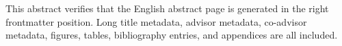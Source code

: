 This abstract verifies that the English abstract page is generated in the right
frontmatter position. Long title metadata, advisor metadata, co-advisor metadata,
figures, tables, bibliography entries, and appendices are all included.
